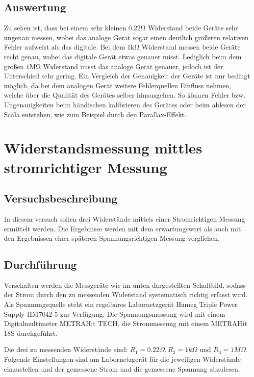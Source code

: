 \documentclass[a4paper, 11pt]{report}
\begin{document}
\subsection{Auswertung}

Zu sehen ist, dass bei einem sehr kleinen \(0.22\si{\ohm}\) Widerstand beide Geräte sehr ungenau messen, wobei das analoge Gerät sogar einen deutlich größeren relativen Fehler aufweist als das digitale.
Bei dem \(1\si{\kilo\ohm}\) Widerstand messen beide Geräte recht genau, wobei das digitale Gerät etwas genauer misst.
Lediglich beim dem großen \(1\si{\mega\ohm}\) Widerstand misst das analoge Gerät genauer, jedoch ist der Unterschied sehr gering. Ein Vergleich der Genauigkeit der Geräte ist nur bedingt möglich, da bei dem analogen Gerät weitere Fehlerquellen Einfluss nehmen, welche über die Qualität des Gerätes selber hinausgehen. So können Fehler bzw. Ungenauigkeiten beim händischen kalibrieren des Gerätes oder beim ablesen der Scala entstehen, wie zum Beispiel durch den Parallax-Effekt.

\section[Stromrichtige Messung]{Widerstandsmessung mittles stromrichtiger Messung}
\subsection{Versuchsbeschreibung}

In diesem versuch sollen drei Widerstände mittels einer Stromrichtigen Messung ermittelt werden. Die Ergebnisse werden mit dem erwartungswert als auch mit den Ergebnissen einer späteren Spannungsrichtigen Messung verglichen.

\subsection{Durchführung}
Verschalten werden die Messgeräte wie im unten dargestellten Schaltbild, sodass der Strom durch den zu messenden Widerstand systematisch richtig erfasst wird. Als Spannungsquelle steht ein regelbares Labornetzgerät Hameg Triple Power Supply HM7042-5 zur Verfügung. Die Spannungsmessung wird mit einem Digitalmultimeter METRAHit TECH, die Strommessung mit einem METRAHit 18S durchgeführt.

Die drei zu messenden Widerstände sind: \(R_1 = 0.22\Omega, R_2 = 1k\Omega \text{ und } R_3 = 1M\Omega\).
Folgende Einstellungen sind am Labornetzgerät für die jeweiligen Widerstände einzustellen und der gemessene Strom und die gemessene Spannung abzulesen.
\end{document}
